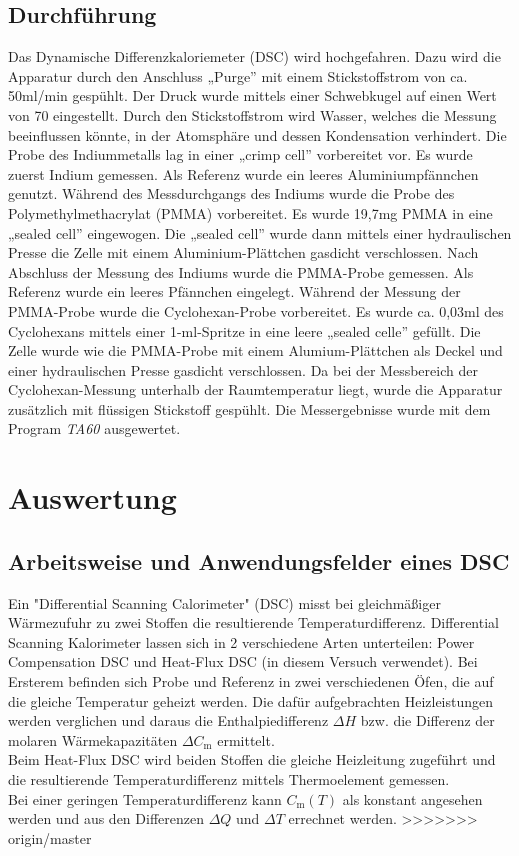 \documentclass[a4paper,12pt,oneside,onecolum,final,openany]{report}
\begin{document}
\section{Durchführung}
Das Dynamische Differenzkaloriemeter (DSC) wird hochgefahren. Dazu wird die Apparatur durch den Anschluss „Purge” \;mit einem Stickstoffstrom von ca. 50\;ml/min gespühlt. Der Druck wurde mittels einer Schwebkugel auf einen Wert von 70 eingestellt. Durch den Stickstoffstrom wird Wasser, welches die Messung beeinflussen könnte, in der Atomsphäre und dessen Kondensation verhindert. Die Probe des Indiummetalls lag in einer „crimp cell” \;vorbereitet vor. Es wurde zuerst Indium gemessen. Als Referenz wurde ein leeres Aluminiumpfännchen genutzt. Während des Messdurchgangs des Indiums wurde die Probe des Polymethylmethacrylat (PMMA) vorbereitet. Es wurde 19,7\;mg PMMA in eine „sealed cell” \;eingewogen. Die „sealed cell” \;wurde dann mittels einer hydraulischen Presse die Zelle mit einem Aluminium-Plättchen gasdicht verschlossen. Nach Abschluss der Messung des Indiums wurde die PMMA-Probe gemessen. Als Referenz wurde ein leeres Pfännchen eingelegt. Während der Messung der PMMA-Probe wurde die Cyclohexan-Probe vorbereitet. Es wurde ca. 0,03\;ml des Cyclohexans mittels einer 1-ml-Spritze in eine leere „sealed celle” \;gefüllt. Die Zelle wurde wie die PMMA-Probe mit einem Alumium-Plättchen als Deckel und einer hydraulischen Presse gasdicht verschlossen. Da bei der Messbereich der Cyclohexan-Messung unterhalb der Raumtemperatur liegt, wurde die Apparatur zusätzlich mit flüssigen Stickstoff gespühlt. Die Messergebnisse wurde mit dem Program \textit{TA60} ausgewertet.  
\chapter{Auswertung}
\section{Arbeitsweise und Anwendungsfelder eines DSC}
Ein "Differential Scanning Calorimeter" (DSC) misst bei gleichmäßiger Wärmezufuhr zu zwei Stoffen die resultierende Temperaturdifferenz.
Differential Scanning Kalorimeter lassen sich in 2 verschiedene Arten unterteilen: Power Compensation DSC und Heat-Flux DSC (in diesem Versuch verwendet). Bei Ersterem befinden sich Probe und Referenz in zwei verschiedenen Öfen, die auf die gleiche Temperatur geheizt werden. Die dafür aufgebrachten Heizleistungen werden verglichen und daraus die Enthalpiedifferenz $\Delta H$ bzw. die Differenz der molaren Wärmekapazitäten $\Delta C_\mathrm{m}$ ermittelt.\\
Beim Heat-Flux DSC wird beiden Stoffen die gleiche Heizleitung zugeführt und die resultierende Temperaturdifferenz mittels Thermoelement gemessen.\\
Bei einer geringen Temperaturdifferenz kann $C_\mathrm{m}(T)$ als konstant angesehen werden und aus den Differenzen $\Delta Q$ und $\Delta T$ errechnet werden.
>>>>>>> origin/master
\end{document}
